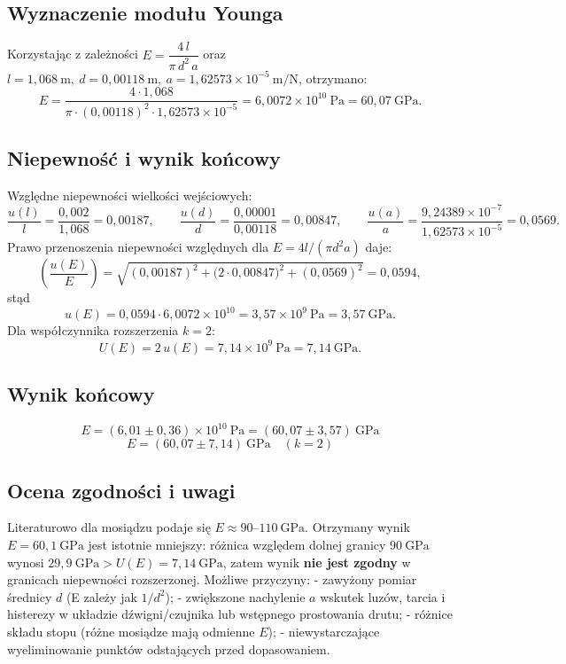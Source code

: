 \documentclass{fizykalab}
\begin{document}
\subsection{Wyznaczenie modułu Younga}

Korzystając z zależności \(E = \dfrac{4\,l}{\pi\,d^{2}\,a}\) oraz
\(l = 1{,}068\ \mathrm{m},\ d=0{,}00118\ \mathrm{m},\
a = 1{,}62573\times 10^{-5}\ \mathrm{m/N}\), otrzymano:
$$
E = \frac{4 \cdot 1{,}068}{\pi \cdot (0{,}00118)^2 \cdot
1{,}62573\times 10^{-5}}
= 6{,}0072\times 10^{10}\ \mathrm{Pa}
= 60{,}07\ \mathrm{GPa}.
$$

\pagebreak

\subsection{Niepewność i wynik końcowy}

Względne niepewności wielkości wejściowych:
$$
\frac{u(l)}{l}=\frac{0{,}002}{1{,}068}=0{,}00187,\qquad
\frac{u(d)}{d}=\frac{0{,}00001}{0{,}00118}=0{,}00847,\qquad
\frac{u(a)}{a}=\frac{9{,}24389\times10^{-7}}{1{,}62573\times10^{-5}}
=0{,}0569.
$$
Prawo przenoszenia niepewności względnych dla
\(E = 4l/(\pi d^{2}a)\) daje:
$$
\left(\frac{u(E)}{E}\right) =
\sqrt{(0{,}00187)^2 + \bigl(2\cdot 0{,}00847\bigr)^2 + (0{,}0569)^2}
= 0{,}0594,
$$
stąd
$$
u(E) = 0{,}0594 \cdot 6{,}0072\times10^{10}
= 3{,}57\times10^{9}\ \mathrm{Pa}
= 3{,}57\ \mathrm{GPa}.
$$
Dla współczynnika rozszerzenia \(k=2\):
$$
U(E) = 2\,u(E) = 7{,}14\times10^{9}\ \mathrm{Pa}
= 7{,}14\ \mathrm{GPa}.
$$

\subsection*{Wynik końcowy}
$$
\boxed{E = (6{,}01 \pm 0{,}36)\times 10^{10}\ \mathrm{Pa}
= (60{,}07 \pm 3{,}57)\ \mathrm{GPa}}
$$
$$
\boxed{E = (60{,}07 \pm 7{,}14)\ \mathrm{GPa}\quad (k=2)}
$$

\subsection{Ocena zgodności i uwagi}

Literaturowo dla mosiądzu podaje się \(E \approx 90\text{--}110\ \mathrm{GPa}\).
Otrzymany wynik \(E = 60{,}1\ \mathrm{GPa}\) jest istotnie mniejszy:
różnica względem dolnej granicy \(90\ \mathrm{GPa}\) wynosi
\(29{,}9\ \mathrm{GPa} > U(E)=7{,}14\ \mathrm{GPa}\),
zatem wynik \textbf{nie jest zgodny} w granicach niepewności
rozszerzonej. Możliwe przyczyny:
- zawyżony pomiar średnicy \(d\) (E zależy jak \(1/d^{2}\));
- zwiększone nachylenie \(a\) wskutek luzów, tarcia i histerezy
w układzie dźwigni/czujnika lub wstępnego prostowania drutu;
- różnice składu stopu (różne mosiądze mają odmienne \(E\));
- niewystarczające wyeliminowanie punktów odstających przed dopasowaniem.
\end{document}
